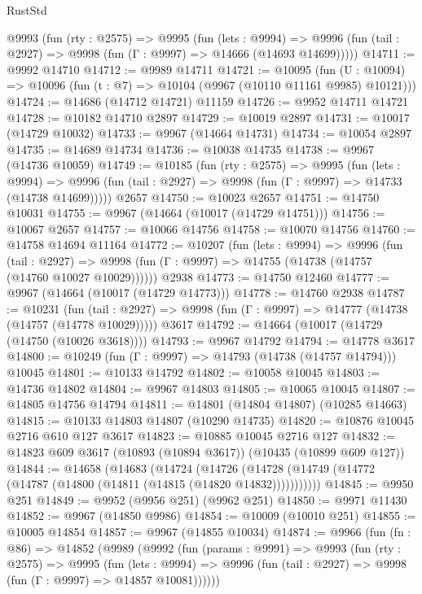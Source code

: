 \begin{lexlean}{RustStd}
\begin{coremodule}
{\begin{coremodule}
{{{{{{{{{{{{{{{{{{{{{{{{{{{{{{{{{{{{{{{{{{{{{{{{{{{{{{{{{{{{{{{{{{{{{{{{{{{{{{  @9993
    (fun (rty : @2575) =>
    @9995
      (fun (lets : @9994) =>
      @9996 (fun (tail : @2927) => @9998 (fun (Γ : @9997) => @14666 (@14693 @14699)))))
@14711 := @9992 @14710
@14712 := @9989 @14711
@14721 := @10095
    (fun (U : @10094) => @10096 (fun (t : @7) => @10104 (@9967 (@10110 @11161 @9985) @10121)))
@14724 := @14686 (@14712 @14721) @11159
@14726 := @9952 @14711 @14721
@14728 := @10182 @14710 @2897
@14729 := @10019 @2897
@14731 := @10017 (@14729 @10032)
@14733 := @9967 (@14664 @14731)
@14734 := @10054 @2897
@14735 := @14689 @14734
@14736 := @10038 @14735
@14738 := @9967 (@14736 @10059)
@14749 := @10185
    (fun (rty : @2575) =>
    @9995
      (fun (lets : @9994) =>
      @9996 (fun (tail : @2927) => @9998 (fun (Γ : @9997) => @14733 (@14738 @14699)))))
    @2657
@14750 := @10023 @2657
@14751 := @14750 @10031
@14755 := @9967 (@14664 (@10017 (@14729 @14751)))
@14756 := @10067 @2657
@14757 := @10066 @14756
@14758 := @10070 @14756
@14760 := @14758 @14694 @11164
@14772 := @10207
    (fun (lets : @9994) =>
    @9996
      (fun (tail : @2927) =>
      @9998 (fun (Γ : @9997) => @14755 (@14738 (@14757 (@14760 @10027 @10029))))))
    @2938
@14773 := @14750 @12460
@14777 := @9967 (@14664 (@10017 (@14729 @14773)))
@14778 := @14760 @2938
@14787 := @10231
    (fun (tail : @2927) => @9998 (fun (Γ : @9997) => @14777 (@14738 (@14757 (@14778 @10029)))))
    @3617
@14792 := @14664 (@10017 (@14729 (@14750 (@10026 @3618))))
@14793 := @9967 @14792
@14794 := @14778 @3617
@14800 := @10249 (fun (Γ : @9997) => @14793 (@14738 (@14757 @14794))) @10045
@14801 := @10133 @14792
@14802 := @10058 @10045
@14803 := @14736 @14802
@14804 := @9967 @14803
@14805 := @10065 @10045
@14807 := @14805 @14756 @14794
@14811 := @14801 (@14804 @14807) (@10285 @14663)
@14815 := @10133 @14803 @14807 (@10290 @14735)
@14820 := @10876 @10045 @2716 @610 @127 @3617
@14823 := @10885 @10045 @2716 @127
@14832 := @14823 @609 @3617 (@10893 (@10894 @3617)) (@10435 (@10899 @609 @127))
@14844 := @14658
    (@14683
      (@14724
        (@14726 (@14728 (@14749 (@14772 (@14787 (@14800 (@14811 (@14815 (@14820 @14832)))))))))))
@14845 := @9950 @251
@14849 := @9952 (@9956 @251) (@9962 @251)
@14850 := @9971 @11430
@14852 := @9967 (@14850 @9986)
@14854 := @10009 (@10010 @251)
@14855 := @10005 @14854
@14857 := @9967 (@14855 @10034)
@14874 := @9966
    (fun (fn : @86) =>
    @14852
      (@9989
        (@9992
          (fun (params : @9991) =>
          @9993
            (fun (rty : @2575) =>
            @9995
              (fun (lets : @9994) =>
              @9996 (fun (tail : @2927) => @9998 (fun (Γ : @9997) => @14857 @10081))))))
}}}}}}}}}}}}}}}}}}}}}}}}}}}}}}}}}}}}}}}}}}}}}}}}}}}}}}}}}}}}}}}}}}}}}}}}}}}}}}
\end{coremodule}}
\end{coremodule}
\end{lexlean}
